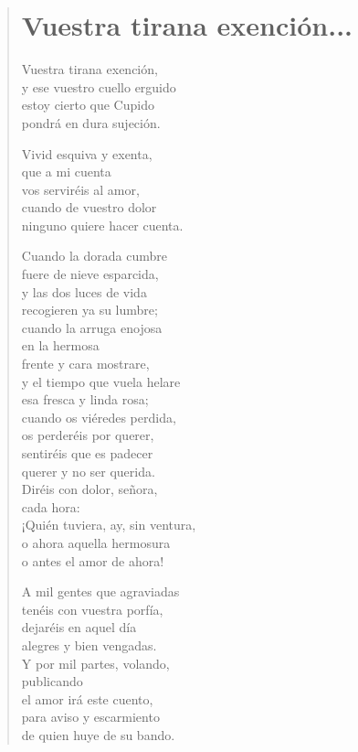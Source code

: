 \documentclass[12pt, twoside]{book}
\begin{document}
\newpage
\begin{verse}
\begin{center}
\section{Vuestra tirana exención...}
\end{center}
Vuestra tirana exención,\\
y ese vuestro cuello erguido\\
estoy cierto que Cupido\\
pondrá en dura sujeción.\newline

Vivid esquiva y exenta,\\
que a mi cuenta\\
vos serviréis al amor,\\
cuando de vuestro dolor\\
ninguno quiere hacer cuenta.\newline

Cuando la dorada cumbre\\
fuere de nieve esparcida,\\
y las dos luces de vida\\
recogieren ya su lumbre;\\
cuando la arruga enojosa\\
en la hermosa\\
frente y cara mostrare,\\
y el tiempo que vuela helare\\
esa fresca y linda rosa;\\
cuando os viéredes perdida,\\
os perderéis por querer,\\
sentiréis que es padecer\\
querer y no ser querida.\\
Diréis con dolor, señora,\\
cada hora:\\
¡Quién tuviera, ay, sin ventura,\\
o ahora aquella hermosura\\
o antes el amor de ahora!\newpage

A mil gentes que agraviadas\\
tenéis con vuestra porfía,\\
dejaréis en aquel día\\
alegres y bien vengadas.\\
Y por mil partes, volando,\\
publicando\\
el amor irá este cuento,\\
para aviso y escarmiento\\
de quien huye de su bando.\newline


\end{verse}
\end{document}
